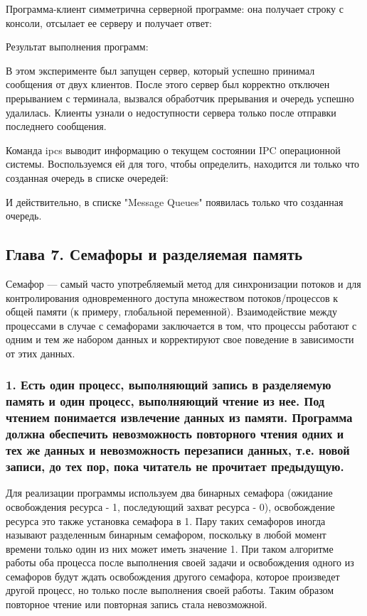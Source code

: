 \documentclass[14pt,a4paper,report]{report}
\begin{document}


Программа-клиент симметрична серверной программе: она получает строку с консоли, отсылает ее серверу и получает ответ:



Результат выполнения программ:



В этом эксперименте был запущен сервер, который успешно принимал сообщения от двух клиентов. После этого сервер был корректно отключен прерыванием с терминала, вызвался обработчик прерывания и очередь успешно удалилась. Клиенты узнали о недоступности сервера только после отправки последнего сообщения.

Команда ipcs выводит информацию о текущем состоянии IPC операционной системы. Воспользуемся ей для того, чтобы определить, находится ли только что созданная очередь в списке очередей:



И действительно, в списке "Message Queues" появилась только что созданная очередь.

\subsection{Глава 7. Семафоры и разделяемая память}

Семафор — самый часто употребляемый метод для синхронизации потоков и для контролирования одновременного доступа множеством потоков/процессов к общей памяти (к примеру, глобальной переменной). Взаимодействие между процессами в случае с семафорами заключается в том, что процессы работают с одним и тем же набором данных и корректируют свое поведение в зависимости от этих данных.

\subsubsection{1. Есть один процесс, выполняющий запись в разделяемую память и один процесс, выполняющий чтение из нее. Под чтением понимается извлечение данных из памяти. Программа должна обеспечить невозможность повторного чтения одних и тех же данных и невозможность перезаписи данных, т.е. новой записи, до тех пор, пока читатель не прочитает предыдущую.}

Для реализации программы используем два бинарных семафора (ожидание освобождения ресурса - 1, последующий захват ресурса - 0), освобождение ресурса это также установка семафора в 1. Пару таких семафоров иногда называют разделенным бинарным семафором, поскольку в любой момент времени только один из них может иметь значение 1. При таком алгоритме работы оба процесса после выполнения своей задачи и освобождения одного из семафоров будут ждать освобождения другого семафора, которое произведет другой процесс, но только после выполнения своей работы. Таким образом повторное чтение или повторная запись стала невозможной.
\end{document}
